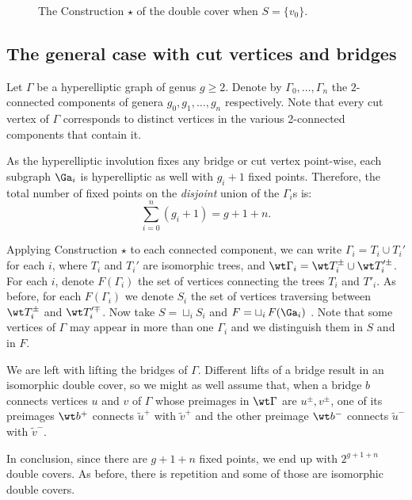 {\begin{exam}
\begin{figure}[ht]
 \caption[below]{The Construction $\star$ of the double cover when $S=\{v_0\}$. }
  \label{fig1}
 \end{figure}
\end{exam}

\subsection{The general case with cut vertices and bridges}\label{generalcase}

Let $\Gamma$ be a hyperelliptic graph of genus $g\geq 2$.
Denote by $\Gamma_0,\dots,\Gamma_{n}$ the $2$-connected components of genera $g_0, g_1,\ldots,g_n$ respectively. Note that every cut vertex of $\Gamma$  corresponds to distinct vertices in the various 2-connected components that contain it. 

As the hyperelliptic involution fixes  any bridge or cut vertex point-wise, each subgraph $\Ga_i$ is hyperelliptic as well with $g_i+1$ fixed points. 
Therefore,  the total number of  fixed points on the \emph{disjoint} union of the $\Gamma_i$s is: \[\sum_{i=0}^{n}(g_{i}+1)=g+1+n.\] 


Applying Construction $\star$ to each connected component, we can write 
 $\Gamma_i = T_i\cup T_i'$ for each $i$, where  $T_i$ and $T_i'$ are isomorphic trees, and $\wt\Gamma_i = \wt T_i^{\pm}\cup\wt T_i'^{\pm}$.  
 For each $i$, denote $F(\Gamma_i)$  the set of vertices  connecting the trees $T_i$ and $T'_i$.
 As before, for each $F(\Gamma_i)$ we denote $S_i$ the set of vertices  traversing between $\wt T_i^{\pm}$ and $\wt T_i'^{\mp}$.
Now take  $S=\sqcup_i S_i$ and  $F=\sqcup_i\, F(\Ga_i)$ . Note that some vertices of $\Gamma$ may appear in more than one $\Gamma_i$ and we  distinguish them in $S$ and in $F$. 
  
 We are left with lifting  the bridges of $\Gamma$.  Different lifts of a bridge result in an isomorphic double cover, so we might as well assume that, when a bridge $b$ connects vertices $u$ and $v$ of $\Gamma$ whose preimages in $\wt\Gamma$ are $u^{\pm},v^{\pm}$,
 one of its preimages  $\wt b^{+}$ connects  $\tilde u^+$ with $\tilde v^+$ and the other preimage $\wt b^{-}$ connects  $\tilde u^-$ with $\tilde v^-$.

In conclusion, since there are $g+1+n$ fixed points, we end up with  $2^{g+1+n}$ double covers. As before, there is repetition and some of those are isomorphic double covers. 


}
